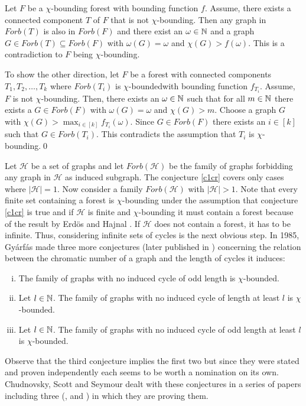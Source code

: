 \begin{prf}
Let $F$ be a $\chi$-bounding forest with bounding function $f$. Assume, there exists a connected component $T$ of $F$ that is not $\chi$-bounding. Then any graph in $\textit{Forb}(T)$ is also in $\textit{Forb}(F)$ and there exist an $\omega \in\mathbb{N}$ and a graph $G\in\textit{Forb}(T)\subseteq\textit{Forb}(F)$ with $\omega (G) =\omega $ and $\chi (G)>f(\omega )$. This is a contradiction to $F$ being $\chi$-bounding.

To show the other direction, let $F$ be a forest with connected components $T_1, T_2,\dots ,T_k$ where $\textit{Forb}	(T_i)$ is $\chi$-boundedwith bounding function $f_{T_i}$. Assume, $F$ is not $\chi$-bounding. Then, there exists an $\omega\in\mathbb{N}$ such that for all $m\in\mathbb{N}$ there exists a $G\in\textit{Forb}(F)$ with $\omega (G)=\omega$ and $\chi (G)> m$. Choose a graph $G$ with $\chi (G)>\max_{i\in [k]}f_{T_i}(\omega)$. Since $G\in\textit{Forb}(F)$ there exists an $i\in [k]$ such that $G\in\textit{Forb}(T_i)$. This contradicts the assumption that $T_i$ is $\chi$-bounding.\qed
\end{prf}

Let $\mathcal{H}$ be a set of graphs and let $\textit{Forb}(\mathcal{H})$ be the family of graphs forbidding any graph in $\mathcal{H}$ as induced subgraph. The conjecture \ref{c1cr} covers only cases where $\vert\mathcal{H}\vert =1$.
Now consider a family $\textit{Forb}(\mathcal{H})$ with $\vert\mathcal{H}\vert >1$. Note that every finite set containing a forest is $\chi$-bounding under the assumption that conjecture \ref{c1cr} is true and if $\mathcal{H}$ is finite and $\chi$-bounding it must contain a forest because of the result by Erd\"os and Hajnal \cite{EH66}. If $\mathcal{H}$ does not contain a forest, it has to be infinite. Thus, considering infinite sets of cycles is the next obvious step. In 1985, Gyárfás made three more conjectures (later published in \cite{Gy87}) concerning the relation between the chromatic number of a graph and the length of cycles it induces:

\begin{enumerate}[(i)]
\item The family of graphs with no induced cycle of odd length is $\chi$-bounded.
\item Let $l\in\mathbb{N}$. The family of graphs with no induced cycle of length at least $l$ is $\chi$-bounded.
\item Let $l\in\mathbb{N}$. The family of graphs with no induced cycle of odd length at least $l$ is $\chi$-bounded.
\end{enumerate}
Observe that the third conjecture implies the first two but since they were stated and proven independently each seems to be worth a nomination on its own. Chudnovsky, Scott and Seymour dealt with these conjectures in a series of papers including three (\cite{SS14}, \cite{CSS15} and \cite{CSSS17}) in which they are proving them.
\\

